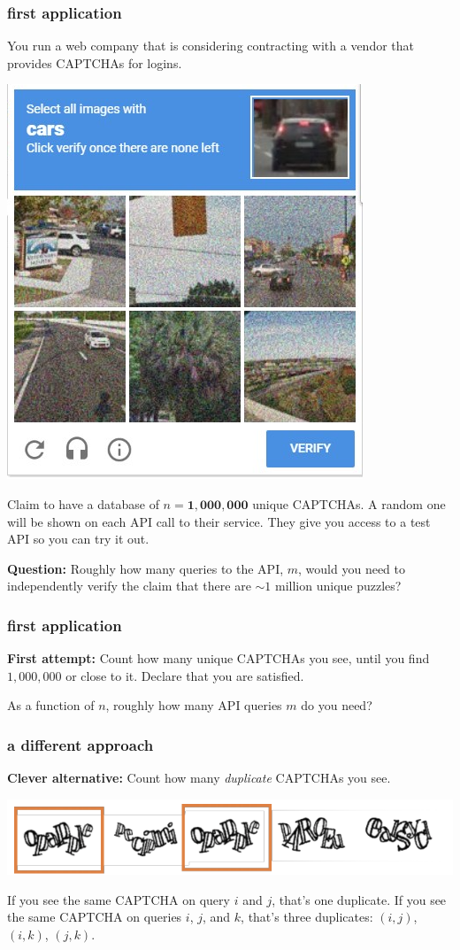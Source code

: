 \documentclass[]{beamer}
\begin{document}
	\begin{frame}
		\frametitle{first application}
		You run a web company that is considering contracting with a vendor that provides CAPTCHAs for logins.
		\begin{center}
			\vspace{-.6em}
			\includegraphics[width=.3\textwidth]{captcha_new.png}
			\vspace{-1.4em}
		\end{center}
		Claim to have a database of $n = \mathbf{1,000,000}$ unique CAPTCHAs. A random one will be shown on each API call to their service. They give you access to a test API so you can try it out.
		
		\textbf{Question:} Roughly how many queries to the API, $m$, would you need to independently verify the claim that there are $\sim 1$ million unique puzzles?  
	\end{frame}
	
	\begin{frame}
		\frametitle{first application}
		\textbf{First attempt:} Count how many unique CAPTCHAs you see, until you find $1,000,000$ or close to it. Declare that you are satisfied. 
		
		As a function of $n$, roughly how many API queries $m$ do you need?
	\end{frame}
	
	\begin{frame}
		\frametitle{a different approach}
		\textbf{Clever alternative:} Count how many \emph{duplicate} CAPTCHAs you see.
		
		\vspace{.5em}
		\begin{center}
			\includegraphics[width=.6\textwidth]{duplicates.png}
			\vspace{.5em}
		\end{center}
	
	 If you see the same CAPTCHA on query $i$ and $j$, that's one duplicate. If you see the same CAPTCHA on queries $i$, $j$, and $k$, that's three duplicates: $(i,j)$, $(i,k)$, $(j,k)$. 
	\end{frame}
	
\end{document}
